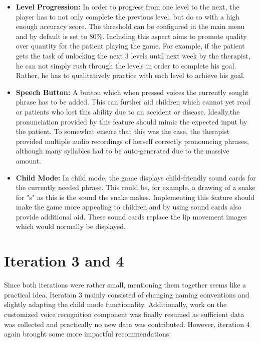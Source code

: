 \documentclass[draft,final]{vutinfth} %
\begin{document}
\begin{itemize}
\item \textbf{Level Progression:} In order to progress from one level to the next, the player has to not only complete the previous level, but do so with a high enough accuracy score. The threshold can be configured in the main menu and by default is set to 80\%. Including this aspect aims to promote quality over quantity for the patient playing the game. For example, if the patient gets the task of unlocking the next 3 levels until next week by the therapist, he can not simply rush through the levels in order to complete his goal. Rather, he has to qualitatively practice with each level to achieve his goal.
\item \textbf{Speech Button:} A button which when pressed voices the currently sought phrase has to be added. This can further aid children which cannot yet read or patients who lost this ability due to an accident or disease. Ideally,the pronunciation provided by this feature should mimic the expected input by the patient. To somewhat ensure that this was the case, the therapist provided multiple audio recordings of herself correctly pronouncing phrases, although many syllables had to be auto-generated due to the massive amount.
\item \textbf{Child Mode:} In child mode, the game displays child-friendly sound cards for the currently needed phrase. This could be, for example, a drawing of a snake for "s" as this is the sound the snake makes. Implementing this feature should make the game more appealing to children and by using sound cards also provide additional aid. These sound cards replace the lip movement images which would normally be displayed.
\end{itemize}
\section{Iteration 3 and 4}
Since both iterations were rather small, mentioning them together seems like a practical idea. Iteration 3 mainly consisted of changing naming conventions and slightly adapting the child mode functionality. Additionally, work on the customized voice recognition component was finally resumed as sufficient data was collected and practically no new data was contributed. However, iteration 4 again brought some more impactful recommendations:
\end{document}
